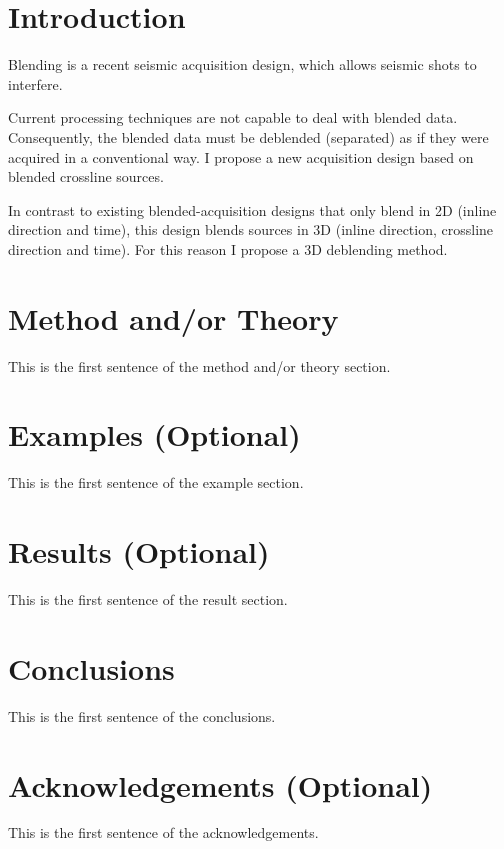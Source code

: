 \documentclass{madrid15WS}
\begin{document}
\section{Introduction}

Blending is a recent seismic acquisition design, which allows seismic shots to interfere. 



Current processing techniques are not capable to deal with blended data. Consequently, the blended data must be deblended (separated) as if they were acquired in a conventional way. I propose a new acquisition design based on blended crossline sources. 


In contrast to existing blended-acquisition designs that only blend in 2D (inline direction and time), this design blends sources in 3D (inline direction, crossline direction and time). For this reason I propose a 3D deblending method. 

\section{Method and/or Theory}

This is the first sentence of the method and/or theory section.

\section{Examples (Optional)}

This is the first sentence of the example section.

\section{Results (Optional)}

This is the first sentence of the result section.


\section{Conclusions}

This is the first sentence of the conclusions.

\section{Acknowledgements (Optional)}

This is the first sentence of the acknowledgements.

%
%
% 
\end{document}
